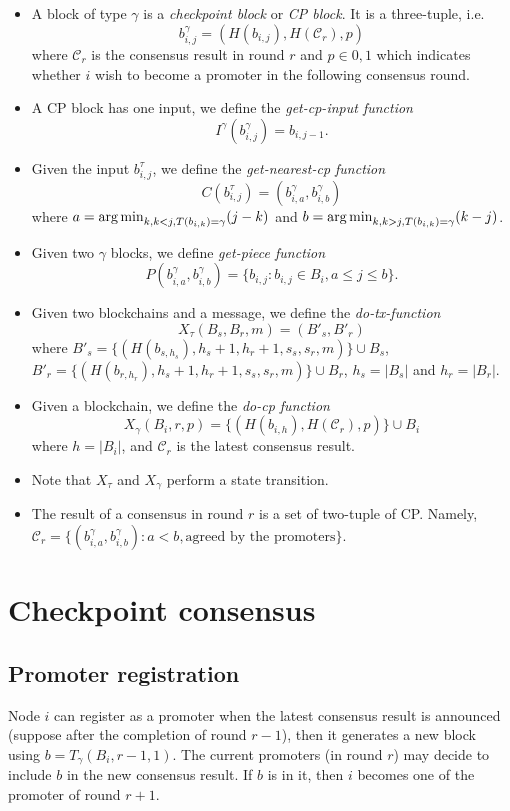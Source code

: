 \begin{itemize}
\item A block of type $\gamma$ is a \emph{checkpoint block} or \emph{CP block}.
  It is a three-tuple, i.e.
  $$b^\gamma_{i,j} = (H(b_{i,j}), H(\mathcal{C}_r), p)$$
  where $\mathcal{C}_r$ is the consensus result in round $r$ and $p \in {0,1}$
  which indicates whether $i$ wish to become a promoter in the following
  consensus round.

\item A CP block has one input, we define the \emph{get-cp-input
    function} $$I^\gamma(b^\gamma_{i,j}) = b_{i,j-1}.$$

\item Given the input $b^\tau_{i,j}$, we define the
  \emph{get-nearest-cp function}
  $$C(b^\tau_{i,j}) = (b^\gamma_{i,a}, b^\gamma_{i,b})$$
  where $a = \operatorname*{arg\,min}_{k, k < j, T(b_{i,k}) = \gamma}(j - k)$ and $b =
  \operatorname*{arg\,min}_{k, k > j, T(b_{i,k}) = \gamma}(k - j)$.

\item Given two $\gamma$ blocks, we define \emph{get-piece function}
  $$P(b^\gamma_{i,a}, b^\gamma_{i,b}) = \{b_{i,j} : b_{i,j} \in B_i, a \le j \le
  b\}.$$

\item Given two blockchains and a message, we define the \emph{do-tx-function}
  $$X_\tau(B_s, B_r, m) = (B'_s, B'_r)$$
  where $B'_s = \{(H(b_{s,h_s}), h_s + 1, h_r + 1, s_s, s_r, m)\} \cup B_s$,
  $B'_r = \{(H(b_{r, h_r}), h_s + 1, h_r + 1, s_s, s_r, m)\} \cup B_r$, $h_s =
  |B_s|$ and $h_r = |B_r|$.

\item Given a blockchain, we define the \emph{do-cp function}
  $$X_\gamma(B_i, r, p) = \{ (H(b_{i,h}), H(\mathcal{C}_r), p) \}\cup B_i$$ where
  $h = |B_i|$, and $\mathcal{C}_r$ is the latest consensus result.

\item Note that $X_\tau$ and $X_\gamma$ perform a state transition.

\item The result of a consensus in round $r$ is a set of two-tuple of CP.
  Namely, $\mathcal{C}_r = \{ (b^\gamma_{i,a}, b^\gamma_{i,b}) : a < b,
  \text{agreed by the promoters}\}$.
\end{itemize}

\section{Checkpoint consensus}

\subsection{Promoter registration}
Node $i$ can register as a promoter when the latest consensus result is
announced (suppose after the completion of round $r-1$), then it generates a new
block using $b = T_\gamma(B_i, r-1, 1)$. The current promoters (in round $r$)
may decide to include $b$ in the new consensus result. If $b$ is in it, then $i$
becomes one of the promoter of round $r+1$.

